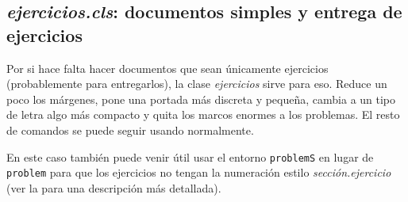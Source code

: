 \subsection{\textit{ejercicios.cls}: documentos simples y entrega de ejercicios}
\label{sec:EjerciciosCls}

Por si hace falta hacer documentos que sean únicamente ejercicios (probablemente para entregarlos), la clase \textit{ejercicios} sirve para eso. Reduce un poco los márgenes, pone una portada más discreta y pequeña, cambia a un tipo de letra algo más compacto y quita los marcos enormes a los problemas. El resto de comandos se puede seguir usando normalmente.

En este caso también puede venir útil usar el entorno \texttt{problemS} en lugar de \texttt{problem} para que los ejercicios no tengan la numeración estilo \textit{sección.ejercicio} (ver la  para una descripción más detallada).

